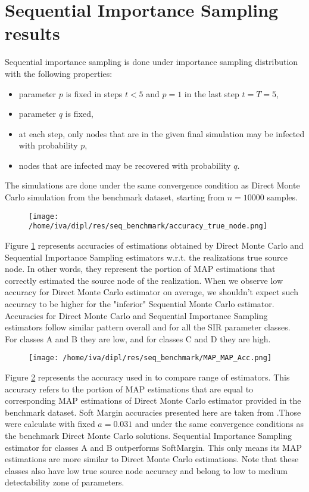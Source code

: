 \documentclass[times, utf8, diplomski]{fer}
\begin{document}
\section{Sequential Importance Sampling results}
 
Sequential importance sampling is done under importance sampling distribution with the following properties:
\begin{itemize}
\item{parameter $p$ is fixed in steps $t<5$ and $p=1$ in the last step $t= T = 5$,}
\item{parameter $q$ is fixed,}
\item{at each step, only nodes that are in the given final simulation may be infected with probability $p$,}
\item{nodes that are infected may be recovered with probability $q$.}
\end{itemize}

The simulations are done under the same convergence condition as Direct Monte Carlo simulation from the benchmark dataset, starting from $n = 10000$ samples.

\begin{figure}[H]
\texttt{[image: /home/iva/dipl/res/seq\_benchmark/accuracy\_true\_node.png]}
\caption{}
\label{accuracy_true}
\end{figure}
Figure \ref{accuracy_true} represents accuracies of estimations obtained by Direct Monte Carlo and Sequential Importance Sampling estimators w.r.t. the realizations true source node. In other words, they represent the portion of MAP estimations that correctly estimated the source node of the realization. When we observe low accuracy for Direct Monte Carlo estimator on average, we shouldn't expect such accuracy to be higher for the "inferior" Sequential Monte Carlo estimator. Accuracies for Direct Monte Carlo and Sequential Importance Sampling estimators follow similar pattern overall and for all the SIR parameter classes. For classes A and B they are low, and for classes C and D they are high. 

\begin{figure}[H]
\texttt{[image: /home/iva/dipl/res/seq\_benchmark/MAP\_MAP\_Acc.png]}
\caption{}
\label{map_map_acc}
\end{figure}
Figure \ref{map_map_acc} represents the accuracy used in \cite{Nino} to compare range of estimators. This accuracy refers to the portion of MAP estimations that are equal to corresponding MAP estimations of Direct Monte Carlo estimator provided in the benchmark dataset. Soft Margin accuracies presented here are taken from \cite{Nino}.Those were calculate with fixed $a=0.031$ and under the same convergence conditions as the benchmark Direct Monte Carlo solutions. Sequential Importance Sampling estimator for classes A and B outperforms SoftMargin. This only means its MAP estimations are  more similar to Direct Monte Carlo estimations. Note that these classes also have low true source node accuracy and belong to low  to medium detectability zone of parameters.
\end{document}
